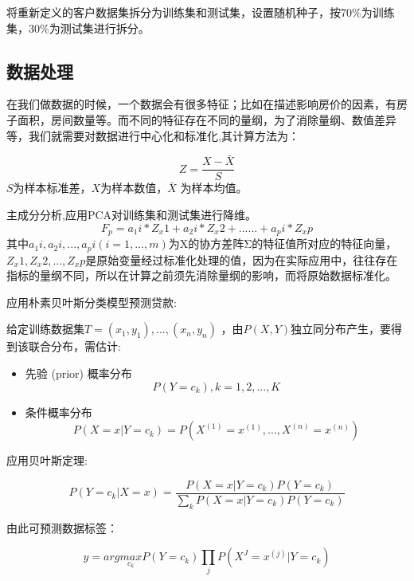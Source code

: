 \documentclass[UTF8]{ctexart}
\begin{document}
将重新定义的客户数据集拆分为训练集和测试集，设置随机种子，按70\%为训练集，30\%为测试集进行拆分。

\subsection{数据处理}

在我们做数据的时候，一个数据会有很多特征；比如在描述影响房价的因素，有房子面积，房间数量等。而不同的特征存在不同的量纲，为了消除量纲、数值差异等，我们就需要对数据进行中心化和标准化,其计算方法为：

\begin{equation}
	Z = \frac{X-\bar{X}}{S}
\end{equation}
$S$为样本标准差，$X$为样本数值，$\bar{X}$ 为样本均值。

主成分分析,应用PCA对训练集和测试集进行降维。
\begin{equation}
	F_p = a_1i*Z_x1+a_2i*Z_x2+......+a_pi*Z_xp
\end{equation}
其中$a_1i, a_2i, ...,a_pi(i=1,...,m)$为X的协方差阵Σ的特征值所对应的特征向量，$Z_x1, Z_x2, ..., Z_xp$是原始变量经过标准化处理的值，因为在实际应用中，往往存在指标的量纲不同，所以在计算之前须先消除量纲的影响，而将原始数据标准化。



应用朴素贝叶斯分类模型预测贷款:

给定训练数据集$T = {(x_1,y_1),...,(x_n,y_n)}$ ，由$P(X,Y)$独立同分布产生，要得到该联合分布，需估计:

\begin{itemize}
	\item 先验 (prior) 概率分布
	\begin{equation}
		P(Y=c_k),k =1,2,...,K
	\end{equation}
	\item 条件概率分布
	\begin{equation}
		P(X=x|Y=c_k) = P(X^{(1)} = x^{(1)},...,X^{(n)} = x^{(n)})
	\end{equation}
	
\end{itemize}

应用贝叶斯定理:

\begin{equation}
	P(Y=c_k|X=x) = \frac{P(X=x|Y=c_k)P(Y=c_k)}{\sum_{k}P(X=x|Y=c_k)P(Y=c_k)}
\end{equation}

由此可预测数据标签：

\begin{equation}
	y = arg  \underset{c_k}{max} P(Y=c_k)\prod_{j}P(X^{J}=x^{(j)}|Y=c_k)
\end{equation}
\end{document}
